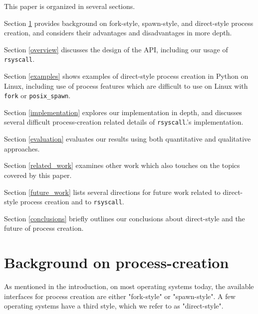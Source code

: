 \documentclass[letterpaper,twocolumn,10pt]{article}
\newcommand{\cmark}{\ding{51}}
\newcommand{\xmark}{\ding{55}}
\begin{document}
This paper is organized in several sections.
\begin{compactitem}
\item Section \ref{background} provides background on fork-style, spawn-style, and direct-style process creation,
and considers their advantages and disadvantages in more depth.
\item Section \ref{overview} discusses the design of the API,
including our usage of \texttt{rsyscall}.
\item Section \ref{examples} shows examples of direct-style process creation in Python on Linux,
including use of process features which are difficult to use on Linux with \texttt{fork} or \texttt{posix\_spawn}.
\item Section \ref{implementation} explores our implementation in depth,
and discusses several difficult process-creation related details of \texttt{rsyscall}.'s implementation.
\item Section \ref{evaluation} evaluates our results using both quantitative and qualitative approaches.
\item Section \ref{related_work} examines other work which also touches on the topics covered by this paper.
\item Section \ref{future_work} lists several directions for future work
related to direct-style process creation and to \texttt{rsyscall}.
\item Section \ref{conclusions} briefly outlines our conclusions about direct-style and the future of process creation.
\end{compactitem}
\section{Background on process-creation}\label{background}
As mentioned in the introduction,
on most operating systems today,
the available interfaces for process creation
are either "fork-style" or "spawn-style".
A few operating systems have a third style, which we refer to as "direct-style".

\newcommand{\tbad}{\xmark:}
\newcommand{\tgood}{\cmark:}
\end{document}
